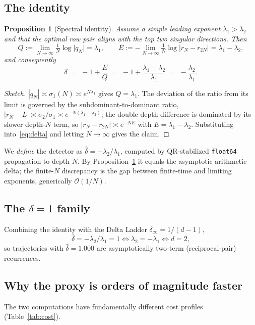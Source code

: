 \documentclass[11pt,a4paper]{article}
\newtheorem{proposition}{Proposition}
\theoremstyle{definition}
\newcommand{\dhat}{\hat{\delta}}
\newcommand{\bigO}{\mathcal{O}}
\begin{document}
\subsection{The identity}
\begin{proposition}[Spectral identity]\label{prop:identity}
Assume a simple leading exponent $\lambda_1>\lambda_2$ and that the optimal row pair aligns
with the top two singular directions. Then
\[
  Q := \lim_{N\to\infty}\tfrac1N\log\lvert q_N\rvert = \lambda_1,
  \qquad
  E := -\lim_{N\to\infty}\tfrac1N\log\lvert r_N-r_{2N}\rvert = \lambda_1-\lambda_2,
\]
and consequently
\[
  \delta \;=\; -1+\frac{E}{Q}
        \;=\; -1+\frac{\lambda_1-\lambda_2}{\lambda_1}
        \;=\; -\frac{\lambda_2}{\lambda_1}.
\]
\end{proposition}
\begin{proof}[Sketch]
$|q_N|\asymp\sigma_1(N)\asymp e^{N\lambda_1}$ gives $Q=\lambda_1$. The deviation of the ratio
from its limit is governed by the subdominant-to-dominant ratio,
$|r_N-L|\asymp\sigma_2/\sigma_1\asymp e^{-N(\lambda_1-\lambda_2)}$; the double-depth difference
is dominated by its slower depth-$N$ term, so $|r_N-r_{2N}|\asymp e^{-NE}$ with
$E=\lambda_1-\lambda_2$. Substituting into~\eqref{eq:delta} and letting $N\to\infty$ gives the
claim.
\end{proof}

We \emph{define} the detector as $\dhat=-\lambda_2/\lambda_1$, computed by QR-stabilized
\texttt{float64} propagation to depth $N$. By Proposition~\ref{prop:identity} it equals the
asymptotic arithmetic delta; the finite-$N$ discrepancy is the gap between finite-time and
limiting exponents, generically $\bigO(1/N)$.

\subsection{The $\dhat=1$ family}
Combining the identity with the Delta Ladder $\delta_\infty=1/(d-1)$,
\[
  \dhat = -\lambda_2/\lambda_1 = 1 \iff \lambda_2=-\lambda_1 \iff d=2,
\]
so trajectories with $\dhat=1.000$ are asymptotically two-term (reciprocal-pair) recurrences.

\subsection{Why the proxy is orders of magnitude faster}
\label{sec:complexity}
The two computations have fundamentally different cost profiles (Table~\ref{tab:cost}).
\end{document}
